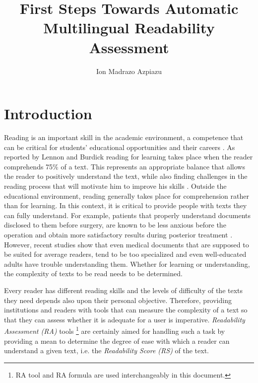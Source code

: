 \documentclass[12pt]{article}
\title{First Steps Towards Automatic Multilingual Readability Assessment}
\author{Ion Madrazo Azpiazu}
\date{}
\begin{document}
\maketitle
\thispagestyle{empty}
\newpage


\tableofcontents
\thispagestyle{empty}
 \newpage

\section{Introduction}

Reading is an important skill in the academic environment, a competence that can be critical for students' educational opportunities and their careers \cite{robinson2000issues}. As reported by Lennon and Burdick \cite{lennon2004lexile}  reading for learning takes place when the reader comprehends  75\% of a text. This represents an appropriate balance that allows the reader to positively understand the text, while also finding challenges in the reading process that will motivate  him to improve his skills \cite{lennon2004lexile}. Outside the educational environment, reading generally takes place for comprehension rather than for learning. In this context, it is critical to provide people with texts they can fully understand. For example, patients 
that properly understand documents disclosed to them before surgery, are known to be less anxious before the operation and obtain more satisfactory results during posterior treatment \cite{medicalReadability2}. However, recent studies\cite{medicalReadability1,medicalReadability2,medicalReadability3}  show that even medical documents that are supposed to be suited for average readers, tend to be too specialized and even well-educated adults have trouble understanding them.
Whether for learning or understanding, the complexity of texts to be read needs to be determined.


Every reader has different reading skills and the levels of difficulty of the texts they need depends also upon their personal objective. Therefore, providing institutions and readers with tools that can measure the complexity of a text so that they can assess whether it is adequate for a user is imperative. \textit{Readability Assessment (RA)} tools \footnote{RA tool and RA formula are used interchangeably in this document.}  are certainly aimed for handling such a task by providing a mean to determine the degree of ease with which a reader can understand a given text, i.e. the \textit{Readability Score (RS)} of the text.
\end{document}
